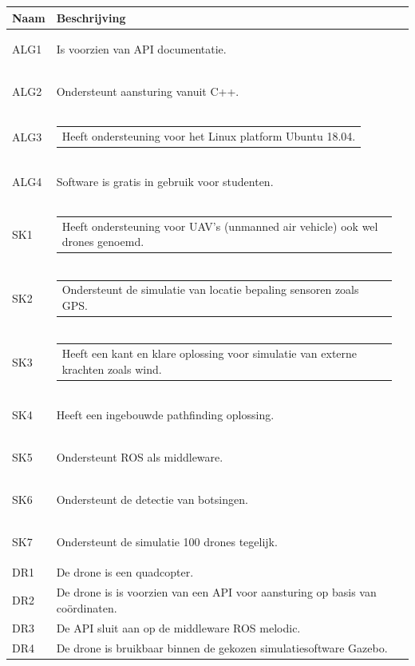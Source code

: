 \documentclass[a4paper, 11pt, oneside]{report}
\begin{document}
\begin{longtable}{|l|l|l|}
	\hline
	\rowcolor[HTML]{C0C0C0} 
	Naam & Beschrijving \\ \hline
	\endhead
		\hypertarget{alg1}{ALG1}	&Is voorzien van API documentatie.        \\ \hline
		\hypertarget{alg2}{ALG2}	&Ondersteunt aansturing vanuit C++.    \\ \hline
		\hypertarget{alg3}{ALG3}	&\begin{tabular}[c]{@{}l@{}}Heeft ondersteuning voor het Linux platform Ubuntu 18.04.\end{tabular}        \\ \hline
		\hypertarget{alg4}{ALG4}	&Software is gratis in gebruik voor studenten.        \\ \hline
		\hypertarget{sk1}{SK1}		&\begin{tabular}[c]{@{}l@{}}Heeft ondersteuning voor UAV's (unmanned air vehicle) ook wel drones genoemd.\end{tabular} \\ \hline
		\hypertarget{sk2}{SK2}		&\begin{tabular}[c]{@{}l@{}}Ondersteunt de simulatie van locatie bepaling sensoren zoals GPS.\end{tabular}        \\ \hline
		\hypertarget{sk3}{SK3}		&\begin{tabular}[c]{@{}l@{}}Heeft een kant en klare oplossing voor simulatie van externe krachten zoals wind.\end{tabular}        \\ \hline
		\hypertarget{sk4}{SK4}		& Heeft een ingebouwde pathfinding oplossing.        \\ \hline
		\hypertarget{sk5}{SK5}		& Ondersteunt ROS als middleware.        \\ \hline
		\hypertarget{sk6}{SK6}		& Ondersteunt de detectie van botsingen.        \\ \hline
		\hypertarget{sk7}{SK7}		& Ondersteunt de simulatie 100 drones tegelijk.        \\ \hline
		DR1		& De drone is een quadcopter.        \\ \hline
		DR2		& De drone is is voorzien van een API voor aansturing op basis van coördinaten.       \\ \hline
		DR3		& De API sluit aan op de middleware ROS melodic.        \\ \hline
		DR4		& De drone is bruikbaar binnen de gekozen simulatiesoftware Gazebo.        \\ \hline

\end{longtable}
\end{document}
